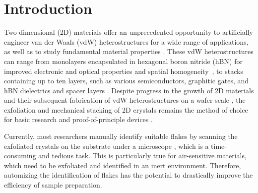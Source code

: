 \documentclass[reprint, prl, superscriptaddress, floatfix]{revtex4-2}
\begin{document}

\maketitle
\date{\today}

\section{Introduction}

Two-dimensional (2D) materials offer an unprecedented opportunity to artificially engineer van der Waals (vdW) heterostructures for a wide range of applications, as well as to study fundamental material properties \cite{Geim2013}. 
These vdW heterostructures can range from monolayers encapsulated in hexagonal boron nitride (hBN) for improved electronic and optical properties and spatial homogeneity~\cite{Dean2010, Neumann2015,Banszerus2015Jul, Cadiz2017, Raja2019}, to stacks containing up to ten layers, such as various semiconductors, graphitic gates, and hBN dielectrics and spacer layers \cite{Xu2020, Park2021, Liu2021}.
Despite progress in the growth of 2D materials \cite{Backes2020Jan,Burton2023Jan} and their subsequent fabrication of vdW heterostructures on a wafer scale \cite{Liu2021_review, Xu2022}, the exfoliation and mechanical stacking of 2D crystals remains the method of choice for basic research and proof-of-principle devices \cite{Liu2016}.

Currently, most researchers manually identify suitable flakes by scanning the exfoliated crystals on the substrate under a microscope \cite{Novoselov2005_2dcrystal}, which is a time-consuming and tedious task.
This is particularly true for air-sensitive materials, which need to be exfoliated and identified in an inert environment. 
Therefore, automizing the identification of flakes has the potential to drastically improve the efficiency of sample preparation.
\end{document}
